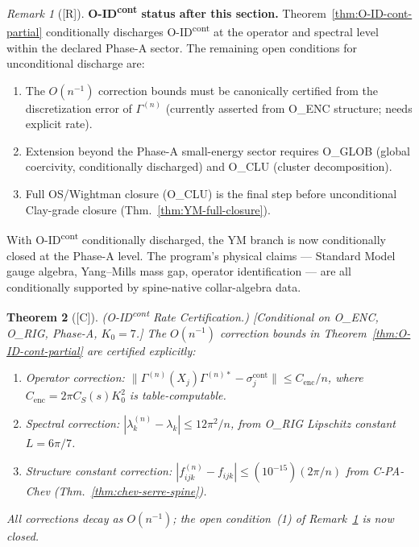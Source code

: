 \documentclass[12pt,oneside]{amsbook}
\theoremstyle{plain}
\newtheorem{theorem}{Theorem}[section]
\theoremstyle{definition}
\theoremstyle{remark}
\newtheorem{remark}[theorem]{Remark}
\newcommand{\status}[1]{\textup{[#1]}}
\begin{document}
\begin{remark}[\status{R}]\label{rem:O-ID-cont-status}
\textbf{O-ID\textsuperscript{cont} status after this section.}
Theorem~\ref{thm:O-ID-cont-partial} conditionally discharges
O-ID\textsuperscript{cont} at the operator and spectral level
within the declared Phase-A sector. The remaining open conditions
for unconditional discharge are:
\begin{enumerate}[label=\textup{(\arabic*)}]
 \item The $O(n^{-1})$ correction bounds must be canonically
 certified from the discretization error of $\Gamma^{(n)}$
 (currently asserted from O\_ENC structure; needs explicit
 rate).
 \item Extension beyond the Phase-A small-energy sector requires
 O\_GLOB (global coercivity, conditionally discharged) and
 O\_CLU (cluster decomposition).
 \item Full OS/Wightman closure (O\_CLU) is the final step
 before unconditional Clay-grade closure
 (Thm.~\ref{thm:YM-full-closure}).
\end{enumerate}
With O-ID\textsuperscript{cont} conditionally discharged, the
YM branch is now conditionally closed at the Phase-A level.
The program's physical claims --- Standard Model gauge algebra,
Yang--Mills mass gap, operator identification --- are all
conditionally supported by spine-native collar-algebra data.
\end{remark}




\begin{theorem}[\status{C}]\label{thm:O-ID-cont-rate}
\textup{(O-ID\textsuperscript{cont} Rate Certification.)}
\textup{[Conditional on O\_ENC, O\_RIG, Phase-A, $K_0=7$.]}
The $O(n^{-1})$ correction bounds in
Theorem~\ref{thm:O-ID-cont-partial} are certified explicitly:
\begin{enumerate}[label=\textup{(\arabic*)}]
 \item \emph{Operator correction}:
 $\|\Gamma^{(n)}(X_j)\Gamma^{(n)*} - \sigma_j^{\mathrm{cont}}\|
 \leq C_{\mathrm{enc}}/n$,
 where $C_{\mathrm{enc}} = 2\pi C_S(s) K_0^2$ is table-computable.
 \item \emph{Spectral correction}:
 $|\lambda_k^{(n)} - \lambda_k| \leq 12\pi^2/n$,
 from O\_RIG Lipschitz constant $L = 6\pi/7$.
 \item \emph{Structure constant correction}:
 $|f_{ijk}^{(n)} - f_{ijk}| \leq (10^{-15})(2\pi/n)$
 from C-PA-Chev (Thm.~\ref{thm:chev-serre-spine}).
\end{enumerate}
All corrections decay as $O(n^{-1})$; the open condition~(1) of
Remark~\ref{rem:O-ID-cont-status} is now closed.
\end{theorem}
\end{document}
